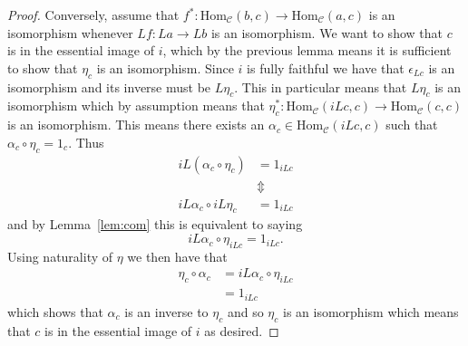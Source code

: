 \begin{proof}
  Conversely, assume that $ f^*:\text{Hom}_{\mathcal{C}}(b,c) \to \text{Hom}_{\mathcal{C}}(a, c) $ is an isomorphism whenever $ Lf: La \to Lb $ is an isomorphism. We want to show that $ c $ is in the essential image of $ i $, which by the previous lemma means it is sufficient to show that $ \eta_c $ is an isomorphism. Since $ i $ is fully faithful we have that $ \epsilon_{Lc} $ is an isomorphism and its inverse must be $ L\eta_c $. This in particular means that $ L\eta_c $ is an isomorphism which by assumption means that $ \eta_c^{*}: \text{Hom}_{\mathcal{C}}(iLc, c) \to \text{Hom}_\mathcal{C}(c, c) $ is an isomorphism. This means there exists an $ \alpha_c \in \text{Hom}_\mathcal{C}(iLc, c) $ such that $ \alpha_c \circ \eta_c = 1_c $. Thus
  \begin{align*}
    iL(\alpha_c \circ \eta_c) &= 1_{iLc} \\
                              &\Updownarrow \\
    iL\alpha_c \circ iL \eta_c &= 1_{iLc}
  \end{align*}
  and by Lemma~\ref{lem:com} this is equivalent to saying
  \begin{equation}
    iL\alpha_c \circ \eta_{iLc} = 1_{iLc}.
  \end{equation}
  Using naturality of $ \eta $ we then have that
  \begin{align*}
    \eta_c \circ \alpha_c &= iL\alpha_c \circ \eta_{iLc} \\
                          &= 1_{iLc}
  \end{align*}
  which shows that $ \alpha_c $ is an inverse to $ \eta_c $ and so $ \eta_c $ is an isomorphism which means that $ c $ is in the essential image of $ i $ as desired.
\end{proof}

